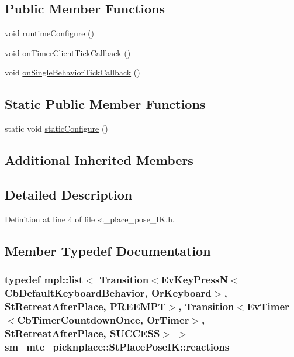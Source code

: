 \subsection*{Public Member Functions}
\begin{DoxyCompactItemize}
\item 
void \hyperlink{structsm__mtc__picknplace_1_1StPlacePoseIK_a28c72606ae8e1169c47faffc90d90773}{runtime\+Configure} ()
\item 
void \hyperlink{structsm__mtc__picknplace_1_1StPlacePoseIK_a87018c2d9807a1c16346c1cf3cd2b554}{on\+Timer\+Client\+Tick\+Callback} ()
\item 
void \hyperlink{structsm__mtc__picknplace_1_1StPlacePoseIK_a7da7c8c3cb810bc474b10189c919467a}{on\+Single\+Behavior\+Tick\+Callback} ()
\end{DoxyCompactItemize}
\subsection*{Static Public Member Functions}
\begin{DoxyCompactItemize}
\item 
static void \hyperlink{structsm__mtc__picknplace_1_1StPlacePoseIK_a9ed8aa162b354dfd0cf56def940e968f}{static\+Configure} ()
\end{DoxyCompactItemize}
\subsection*{Additional Inherited Members}


\subsection{Detailed Description}


Definition at line 4 of file st\+\_\+place\+\_\+pose\+\_\+\+I\+K.\+h.



\subsection{Member Typedef Documentation}
\subsubsection[{\texorpdfstring{reactions}{reactions}}]{\setlength{\rightskip}{0pt plus 5cm}typedef mpl\+::list$<$ Transition$<$Ev\+Key\+PressN$<$Cb\+Default\+Keyboard\+Behavior, {\bf Or\+Keyboard}$>$, {\bf St\+Retreat\+After\+Place}, {\bf P\+R\+E\+E\+M\+PT}$>$, Transition$<$Ev\+Timer$<$Cb\+Timer\+Countdown\+Once, {\bf Or\+Timer}$>$, {\bf St\+Retreat\+After\+Place}, {\bf S\+U\+C\+C\+E\+SS}$>$ $>$ {\bf sm\+\_\+mtc\+\_\+picknplace\+::\+St\+Place\+Pose\+I\+K\+::reactions}}\hypertarget{structsm__mtc__picknplace_1_1StPlacePoseIK_a81b4f8ab24331080f42d4599f1765ad3}{}\label{structsm__mtc__picknplace_1_1StPlacePoseIK_a81b4f8ab24331080f42d4599f1765ad3}


